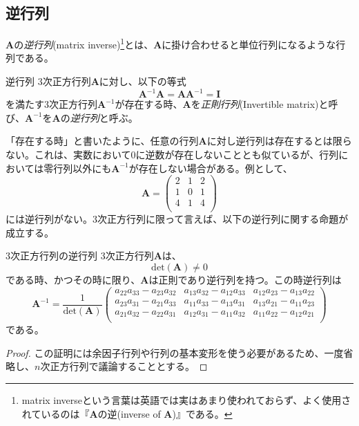 \subsection{逆行列}
\(\boldsymbol{A}\)の\emph{逆行列}(matrix inverse)\footnote{matrix inverseという言葉は英語では実はあまり使われておらず、よく使用されているのは『\(\boldsymbol{A}\)の逆(inverse of \(\boldsymbol{A}\))』である。}とは、\(\boldsymbol{A}\)に掛け合わせると単位行列になるような行列である。
\begin{definition*}{逆行列}
	3次正方行列\(\boldsymbol{A}\)に対し、以下の等式
	\begin{equation}
		\boldsymbol{A}^{-1}\boldsymbol{A}=\boldsymbol{A}\boldsymbol{A}^{-1}=\boldsymbol{I}
		\label{eq:mat_inv}
	\end{equation}
	を満たす3次正方行列\(\boldsymbol{A}^{-1}\)が存在する時、\(\boldsymbol{A}\)を\emph{正則行列}(Invertible matrix)と呼び、\(\boldsymbol{A}^{-1}\)を\(\boldsymbol{A}\)の\emph{逆行列}と呼ぶ。
\end{definition*}
「存在する時」と書いたように、任意の行列\(\boldsymbol{A}\)に対し逆行列は存在するとは限らない。これは、実数において\(0\)に逆数が存在しないこととも似ているが、行列においては零行列以外にも\(\boldsymbol{A}^{-1}\)が存在しない場合がある。例として、
\begin{equation}
	\boldsymbol{A}=
	\begin{pmatrix}
		2 & 1 & 2 \\
		1 & 0 & 1 \\
		4 & 1 & 4 \\
	\end{pmatrix}
\end{equation}
には逆行列がない。3次正方行列に限って言えば、以下の逆行列に関する命題が成立する。
\begin{theorem*}{3次正方行列の逆行列}
	3次正方行列\(\boldsymbol{A}\)は、
	\begin{equation}
		\mathrm{det}(\boldsymbol{A})\neq 0
	\end{equation}
	である時、かつその時に限り、\(\boldsymbol{A}\)は正則であり逆行列を持つ。この時逆行列は
	\begin{equation}
		\boldsymbol{A}^{-1}=\frac{1}{\mathrm{det}(\boldsymbol{A}) }
		\begin{pmatrix}
			a_{22}a_{33}-a_{23}a_{32} & a_{13}a_{32}-a_{12}a_{33} & a_{12}a_{23}-a_{13}a_{22} \\
			a_{23}a_{31}-a_{21}a_{33} & a_{11}a_{33}-a_{13}a_{31} & a_{13}a_{21}-a_{11}a_{23} \\
			a_{21}a_{32}-a_{22}a_{31} & a_{12}a_{31}-a_{11}a_{32} & a_{11}a_{22}-a_{12}a_{21} \\
		\end{pmatrix}
	\end{equation}
	である。
\end{theorem*}
\begin{proof}
	この証明には余因子行列や行列の基本変形を使う必要があるため、一度省略し、\(n\)次正方行列で議論することとする。
\end{proof}
